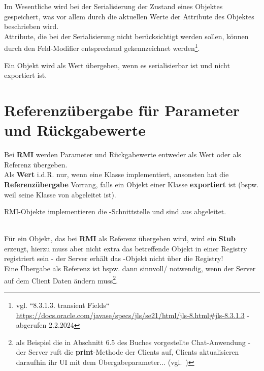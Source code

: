 \noindent
Im Wesentliche wird bei der Serialisierung der Zustand eines Objektes gespeichert, was vor allem durch die aktuellen Werte der Attribute des Objektes beschrieben wird.\\

\noindent
Attribute, die bei der Serialisierung nicht berücksichtigt werden sollen, können durch den Feld-Modifier  entsprechend gekennzeichnet werden\footnote{
vgl. ``8.3.1.3. transient Fields`` \url{https://docs.oracle.com/javase/specs/jls/se21/html/jls-8.html#jls-8.3.1.3} - abgerufen 2.2.2024
}.


\begin{tcolorbox}[enlarge top by=0.5cm,enlarge bottom by=0.5cm]
    Ein Objekt wird als Wert übergeben, wenn es serialisierbar ist und nicht exportiert ist.
\end{tcolorbox}


\section{Referenzübergabe für Parameter und Rückgabewerte}

Bei \textbf{RMI} werden Parameter und Rückgabewerte entweder als Wert oder als Referenz übergeben.\\

\noindent
Als \textbf{Wert} i.d.R. nur, wenn eine Klasse  implementiert, ansonsten hat die \textbf{Referenzübergabe} Vorrang, falls ein Objekt einer Klasse \textbf{exportiert} ist (bspw. weil seine Klasse von  abgeleitet ist).

\begin{tcolorbox}[enlarge top by=0.5cm,enlarge bottom by=0.5cm]
    RMI-Objekte implementieren die -Schnittstelle und sind aus  abgeleitet.
\end{tcolorbox}\\

\noindent
Für ein Objekt, das bei \textbf{RMI} als Referenz übergeben wird, wird ein \textbf{Stub} erzeugt, hierzu muss aber nicht extra das betreffende Objekt in einer Registry registriert sein - der Server erhält das -Objekt nicht über die Registry!\\

\noindent
Eine Übergabe als Referenz ist bspw. dann sinnvoll/ notwendig, wenn der Server auf dem Client Daten ändern muss\footnote{als Beispiel die in Abschnitt 6.5 des Buches vorgestellte Chat-Anwendung - der Server ruft die \textbf{print}-Methode der Clients auf, Clients aktualisieren daraufhin ihr UI mit dem Übergabeparameter... (vgl.~\cite[Listing 6.22, Listing 6.24]{Oec22})}.\\

